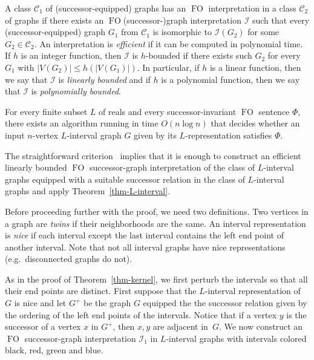 \documentclass{CSML}
\newcommand{\FO}{\ensuremath{\operatorname{FO}}\xspace}
\newcommand{\cI}{\mathcal{I}}
\newcommand{\CC}{\mathcal{C}}
\theoremstyle{plain}\newtheorem{claim}[thm]{Claim}
\begin{document}
A class $\CC_1$ of (successor-equipped) graphs has an \FO interpretation in a class $\CC_2$ of graphs
if there exists an \FO (successor-)graph interpretation $\cI$ such that every (successor-equipped) graph $G_1$ from $\CC_1$
is isomorphic to $\cI(G_2)$ for some $G_2\in\CC_2$.
An interpretation is {\em efficient} if it can be computed in polynomial time.
If $h$ is an integer function, then $\cI$ is $h$-bounded
if there exists such $G_2$ for every $G_1$ with $|V(G_2)|\le h(|V(G_1)|)$.
In particular, if $h$ is a linear function, then we say that $\cI$ is {\em linearly bounded} and
if $h$ is a polynomial function, then we say that $\cI$ is {\em polynomially bounded}.

\begin{thm}
\label{thm-L-interval-succ}
For every finite subset $L$ of reals and every successor-invariant \FO sentence $\Phi$, there exists an algorithm
running in time $O(n\log n)$ that decides whether an input $n$-vertex $L$-interval graph $G$
given by its $L$-representation satisfies $\Phi$.
\end{thm}

\proof
The straightforward criterion~\cite[Lemma~5.3]{EKS12} implies that
it is enough to construct an efficient linearly bounded \FO successor-graph
interpretation of the class of $L$-interval graphs equipped with a suitable
successor relation in the class of $L$-interval graphs and apply Theorem~\ref{thm-L-interval}.

Before proceeding further with the proof, we need two definitions.
Two vertices in a graph are {\em twins} if their neighborhoods are the same.
An interval representation is {\em nice} if each interval except the last interval contains the left end point of another interval.
Note that not all interval graphs have nice representations (e.g.~disconnected graphs do not).

As in the proof of Theorem~\ref{thm-kernel}, we first perturb the intervals so that all their end points are distinct.
First suppose that the $L$-interval representation of $G$ is nice and
let $G^+$ be the graph $G$ equipped the the successor relation given by 
the ordering of the left end points of the intervals.
Notice that if a vertex $y$ is the successor of a vertex $x$ in $G^+$, then
$x,y$ are adjacent in~$G$.
We now construct an \FO successor-graph interpretation $\cI_1$ in $L$-interval graphs with intervals colored black, red, green and blue.
\end{document}
